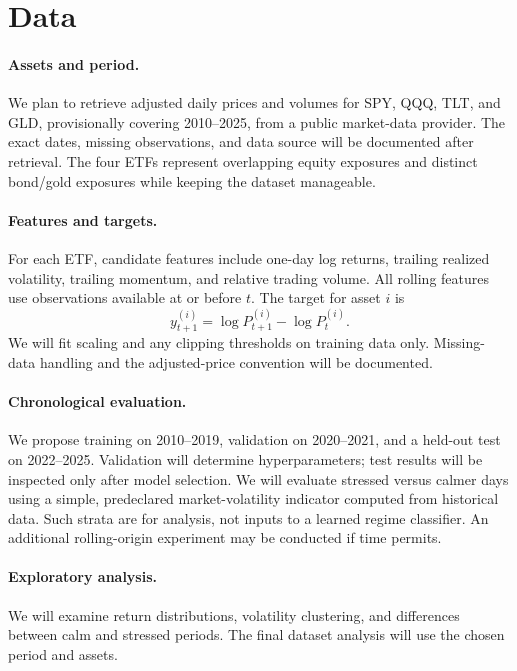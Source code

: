 \documentclass{article}
\begin{document}
\section{Data}
\paragraph{Assets and period.}
We plan to retrieve adjusted daily prices and volumes for SPY, QQQ, TLT, and GLD, provisionally covering 2010--2025, from a public market-data provider. The exact dates, missing observations, and data source will be documented after retrieval. The four ETFs represent overlapping equity exposures and distinct bond/gold exposures while keeping the dataset manageable.

\paragraph{Features and targets.}
For each ETF, candidate features include one-day log returns, trailing realized volatility, trailing momentum, and relative trading volume. All rolling features use observations available at or before $t$. The target for asset $i$ is
\begin{equation}
y_{t+1}^{(i)}=\log P_{t+1}^{(i)}-\log P_t^{(i)}.
\end{equation}
We will fit scaling and any clipping thresholds on training data only. Missing-data handling and the adjusted-price convention will be documented.

\paragraph{Chronological evaluation.}
We propose training on 2010--2019, validation on 2020--2021, and a held-out test on 2022--2025. Validation will determine hyperparameters; test results will be inspected only after model selection. We will evaluate stressed versus calmer days using a simple, predeclared market-volatility indicator computed from historical data. Such strata are for analysis, not inputs to a learned regime classifier. An additional rolling-origin experiment may be conducted if time permits.

\paragraph{Exploratory analysis.}
We will examine return distributions, volatility clustering, and differences between calm and stressed periods. The final dataset analysis will use the chosen period and assets.
\end{document}
